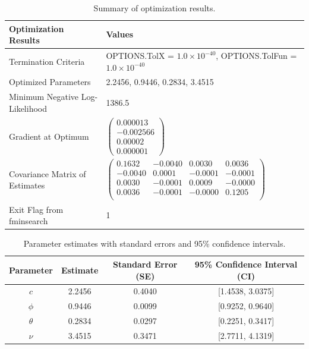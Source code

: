 \documentclass[11pt]{article}
\begin{document}
\begin{table}[h!]
\centering
\begin{tabular}{|l|l|}
\hline
\textbf{Optimization Results}              & \textbf{Values}                                                                 \\ \hline
Termination Criteria                       & OPTIONS.TolX = $1.0 \times 10^{-40}$, OPTIONS.TolFun = $1.0 \times 10^{-40}$     \\ \hline
Optimized Parameters                       & 2.2456, 0.9446, 0.2834, 3.4515                                                  \\ \hline
Minimum Negative Log-Likelihood            & 1386.5                                                                          \\ \hline
Gradient at Optimum                        & $\begin{pmatrix}
0.000013 \\
-0.002566 \\
0.00002 \\
0.000001
\end{pmatrix}$                                                                  \\ \hline
Covariance Matrix of Estimates             & $\begin{pmatrix}
0.1632 & -0.0040 & 0.0030 & 0.0036 \\
-0.0040 & 0.0001 & -0.0001 & -0.0001 \\
0.0030 & -0.0001 & 0.0009 & -0.0000 \\
0.0036 & -0.0001 & -0.0000 & 0.1205 \\
\end{pmatrix}$                                                                \\ \hline
Exit Flag from fminsearch                  & 1                                                                              \\ \hline
\end{tabular}
\caption{Summary of optimization results.}
\label{tab:optimization_results}
\end{table}


\begin{table}[h!]
\centering
\begin{tabular}{|c|c|c|c|}
\hline
\textbf{Parameter} & \textbf{Estimate} & \textbf{Standard Error (SE)} & \textbf{95\% Confidence Interval (CI)} \\ \hline
$c$     & 2.2456 & 0.4040 & [1.4538, 3.0375] \\ \hline
$\phi$  & 0.9446 & 0.0099 & [0.9252, 0.9640] \\ \hline
$\theta$ & 0.2834 & 0.0297 & [0.2251, 0.3417] \\ \hline
$\nu$    & 3.4515 & 0.3471 & [2.7711, 4.1319] \\ \hline
\end{tabular}
\caption{Parameter estimates with standard errors and 95\% confidence intervals.}
\label{tab:firstconfidence_intervals}
\end{table}
\end{document}
